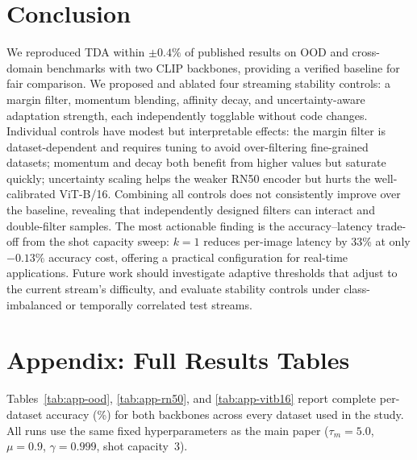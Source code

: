 \documentclass[10pt,twocolumn,letterpaper]{article}
\begin{document}
\section{Conclusion}

We reproduced TDA within $\pm0.4\%$ of published results on OOD and
cross-domain benchmarks with two CLIP backbones, providing a verified
baseline for fair comparison.
We proposed and ablated four streaming stability controls: a margin
filter, momentum blending, affinity decay, and uncertainty-aware
adaptation strength, each independently togglable without code changes.
Individual controls have modest but interpretable effects: the margin
filter is dataset-dependent and requires tuning to avoid
over-filtering fine-grained datasets; momentum and decay both benefit
from higher values but saturate quickly; uncertainty scaling helps the
weaker RN50 encoder but hurts the well-calibrated ViT-B/16.
Combining all controls does not consistently improve over the baseline,
revealing that independently designed filters can interact and
double-filter samples.
The most actionable finding is the accuracy--latency trade-off from
the shot capacity sweep: $k{=}1$ reduces per-image latency by 33\%
at only $-0.13\%$ accuracy cost, offering a practical configuration
for real-time applications.
Future work should investigate adaptive thresholds that adjust to the
current stream's difficulty, and evaluate stability controls under
class-imbalanced or temporally correlated test streams.

{\small}

\clearpage
\onecolumn
\appendix
\section*{Appendix: Full Results Tables}

\noindent Tables~\ref{tab:app-ood}, \ref{tab:app-rn50}, and
\ref{tab:app-vitb16} report complete per-dataset accuracy (\%) for
both backbones across every dataset used in the study.  All runs use
the same fixed hyperparameters as the main paper
($\tau_m{=}5.0$, $\mu{=}0.9$, $\gamma{=}0.999$, shot capacity~3).
\end{document}

